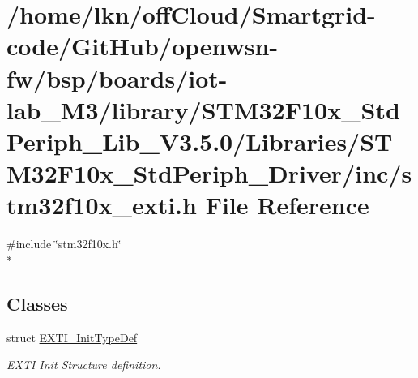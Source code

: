 \hypertarget{iot-lab___m3_2library_2_s_t_m32_f10x___std_periph___lib___v3_85_80_2_libraries_2_s_t_m32_f10x___94bb354065217a40117a2df897166b95}{}\section{/home/lkn/off\+Cloud/\+Smartgrid-\/code/\+Git\+Hub/openwsn-\/fw/bsp/boards/iot-\/lab\+\_\+\+M3/library/\+S\+T\+M32\+F10x\+\_\+\+Std\+Periph\+\_\+\+Lib\+\_\+\+V3.5.0/\+Libraries/\+S\+T\+M32\+F10x\+\_\+\+Std\+Periph\+\_\+\+Driver/inc/stm32f10x\+\_\+exti.h File Reference}
\label{iot-lab___m3_2library_2_s_t_m32_f10x___std_periph___lib___v3_85_80_2_libraries_2_s_t_m32_f10x___94bb354065217a40117a2df897166b95}
{\ttfamily \#include \char`\"{}stm32f10x.\+h\char`\"{}}\\*
\subsection*{Classes}
\begin{DoxyCompactItemize}
\item 
struct \hyperlink{struct_e_x_t_i___init_type_def}{E\+X\+T\+I\+\_\+\+Init\+Type\+Def}
\begin{DoxyCompactList}\small\item\em E\+X\+TI Init Structure definition. \end{DoxyCompactList}\end{DoxyCompactItemize}
